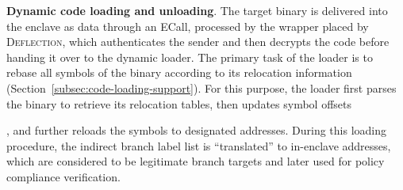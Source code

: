 \vspace{3pt}\noindent\textbf{Dynamic code loading and unloading}. \label{subsec-loading}
The target binary is delivered into the enclave as data through an ECall, processed by the wrapper placed by \textsc{Deflection}, which authenticates the sender and then decrypts the code before handing it over to the dynamic loader. The primary task of the loader is to rebase all symbols of the binary according to its relocation information (Section~\ref{subsec:code-loading-support}). For this purpose, the loader first parses the binary to retrieve its relocation tables,  then updates symbol offsets, and further reloads the symbols to designated addresses. During this loading procedure, the indirect branch label list is ``translated'' to in-enclave addresses, which are considered to be legitimate branch targets and later used for policy compliance verification. 


